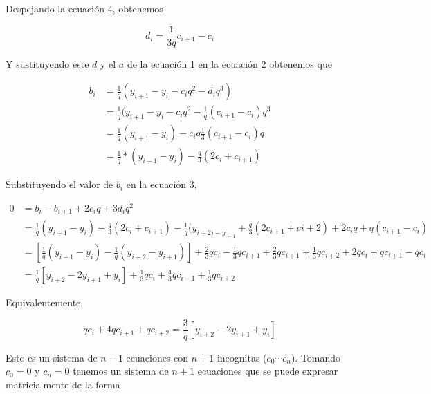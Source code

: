 Despejando la ecuaci\'on 4, obtenemos

\[
d_i = \frac{1}{3 q} c_{i + 1} - c_i
\]

Y sustituyendo este $d$ y el $a$ de la ecuaci\'on 1 en la ecuaci\'on 2 obtenemos
que

\[
\begin{split}
b_i & = \frac{1}{q} (y_{i + 1} - y_i - c_i q^2 - d_i q^3) \\
& = \frac{1}{q} (y_{i + 1} - y_i - c_i q^2 - \frac{1}{q} (c_{i + 1} - c_i) q^3 \\
& = \frac{1}{q} (y_{i + 1} - y_i) - c_i q \frac{1}{3} (c_{i + 1} - c_i) q \\
& = \frac{1}{q} * (y_{i + 1} - y_i) - \frac{q}{3} (2 c_i + c_{i + 1})
\end{split}
\]

Substituyendo el valor de $b_i$ en la ecuaci\'on 3,

\[
\begin{split}
0 & = b_i - b_{i + 1} + 2 c_i q + 3 d_i q^2 \\
& = \frac{1}{q} (y_{i + 1} - y_i) - \frac{q}{3} (2 c_i + c_{i + 1}) - \frac{1}{q} (y_{i + 2) - y_{i + 1}} + \frac{q}{3} (2 c_{i + 1} + c{i + 2}) + 2 c_i q + q (c_{i + 1} - c_i) \\
& = \left[ \frac{1}{q} (y_{i + 1} - y_i) - \frac{1}{q} (y_{i + 2} - y_{i + 1}) \right] + \frac{2}{3} q c_i - \frac{1}{3} q c_{i + 1} + \frac{2}{3} q c_{i + 1} + \frac{1}{3} q c_{i + 2} + 2 q c_i + q c_{i + 1} - q c_i \\
& = \frac{1}{q} \left[ y_{i + 2} - 2 y_{i + 1} + y_i \right] + \frac{1}{3} q c_i + \frac{4}{3} q c_{i + 1} + \frac{1}{3} q c_{i + 2}
\end{split}
\]

Equivalentemente,

\[
q c_i + 4 q c_{i + 1} + q c_{i + 2} = \frac{3}{q} \left[ y_{i + 2} - 2 y_{i + 1} + y_i \right]
\]

Esto es un sistema de $n - 1$ ecuaciones con $n + 1$ incognitas ($c_0 \cdots
c_n$). Tomando $c_0 = 0$ y $c_n = 0$ tenemos un sistema de $n + 1$ ecuaciones
que se puede expresar matricialmente de la forma

